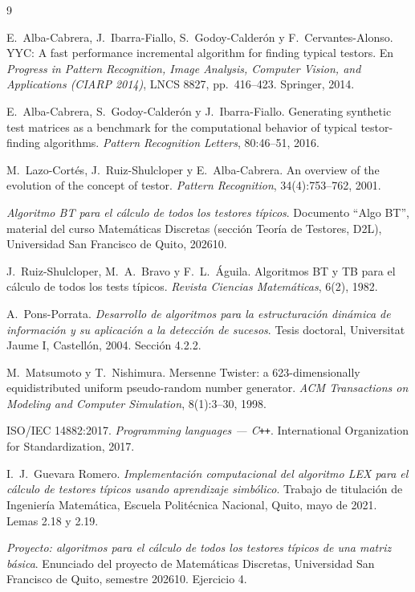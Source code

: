\documentclass[11pt, a4paper]{article}
\theoremstyle{definition}
\theoremstyle{plain}
\begin{document}
\begin{thebibliography}{9}

E.~Alba-Cabrera, J.~Ibarra-Fiallo, S.~Godoy-Calderón y F.~Cervantes-Alonso.
\newblock YYC: A fast performance incremental algorithm for finding typical testors.
\newblock En \emph{Progress in Pattern Recognition, Image Analysis, Computer Vision,
and Applications (CIARP 2014)}, LNCS 8827, pp.~416--423. Springer, 2014.

E.~Alba-Cabrera, S.~Godoy-Calderón y J.~Ibarra-Fiallo.
\newblock Generating synthetic test matrices as a benchmark for the computational
behavior of typical testor-finding algorithms.
\newblock \emph{Pattern Recognition Letters}, 80:46--51, 2016.

M.~Lazo-Cortés, J.~Ruiz-Shulcloper y E.~Alba-Cabrera.
\newblock An overview of the evolution of the concept of testor.
\newblock \emph{Pattern Recognition}, 34(4):753--762, 2001.

\emph{Algoritmo BT para el cálculo de todos los testores típicos}.
\newblock Documento ``Algo BT'', material del curso Matemáticas Discretas
(sección Teoría de Testores, D2L), Universidad San Francisco de Quito, 202610.

J.~Ruiz-Shulcloper, M.~A.~Bravo y F.~L.~Águila.
\newblock Algoritmos BT y TB para el cálculo de todos los tests típicos.
\newblock \emph{Revista Ciencias Matemáticas}, 6(2), 1982.

A.~Pons-Porrata.
\newblock \emph{Desarrollo de algoritmos para la estructuración dinámica de
información y su aplicación a la detección de sucesos}.
\newblock Tesis doctoral, Universitat Jaume I, Castellón, 2004. Sección 4.2.2.

M.~Matsumoto y T.~Nishimura.
\newblock Mersenne Twister: a 623-dimensionally equidistributed uniform
pseudo-random number generator.
\newblock \emph{ACM Transactions on Modeling and Computer Simulation}, 8(1):3--30, 1998.

ISO/IEC 14882:2017.
\newblock \emph{Programming languages --- C\texttt{++}}. International Organization for
Standardization, 2017.

I.~J.~Guevara Romero.
\newblock \emph{Implementación computacional del algoritmo LEX para el cálculo
de testores típicos usando aprendizaje simbólico}.
\newblock Trabajo de titulación de Ingeniería Matemática, Escuela Politécnica
Nacional, Quito, mayo de 2021. Lemas 2.18 y 2.19.

\emph{Proyecto: algoritmos para el cálculo de todos los testores típicos de una
matriz básica}.
\newblock Enunciado del proyecto de Matemáticas Discretas, Universidad San
Francisco de Quito, semestre 202610. Ejercicio 4.

\end{thebibliography}
\end{document}
